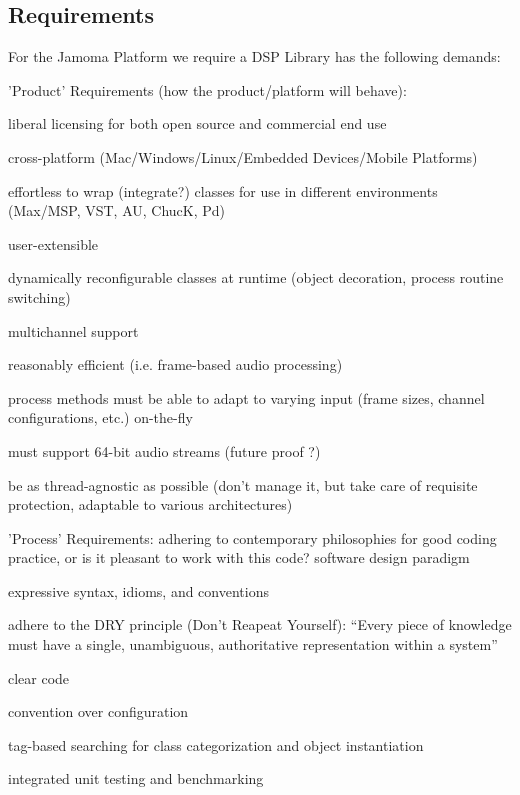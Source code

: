 \documentclass[twoside,10pt]{article}
\newenvironment{packed_item}{
\begin{itemize}
  \setlength{\itemsep}{1pt}
  \setlength{\parskip}{0pt}
  \setlength{\parsep}{0pt}
}{\end{itemize}}
\begin{document}
\subsection{Requirements}

For the Jamoma Platform we require a DSP Library has the following demands:

'Product' Requirements (how the product/platform will behave):
\begin{packed_item}%
	\item liberal licensing for both open source and commercial end use
	\item cross-platform (Mac/Windows/Linux/Embedded Devices/Mobile Platforms)
	
	\item effortless to wrap (integrate?) classes for use in different environments (Max/MSP, VST, AU, ChucK, Pd)
	\item user-extensible
	\item dynamically reconfigurable classes at runtime (object decoration, process routine switching)
	\item multichannel support
	\item reasonably efficient (i.e. frame-based audio processing)
	\item process methods must be able to adapt to varying input (frame sizes, channel configurations, etc.) on-the-fly
	\item must support 64-bit audio streams (future proof ?)
	\item be as thread-agnostic as possible (don't manage it, but take care of requisite protection, adaptable to various architectures)
\end{packed_item}%


'Process' Requirements:  adhering to contemporary philosophies for good coding practice, or is it pleasant to work with this code? software design paradigm
\begin{packed_item}%
	\item expressive syntax, idioms, and conventions
	\item adhere to the DRY principle (Don't Reapeat Yourself): ``Every piece of knowledge must have a single, unambiguous, authoritative representation within a system''\cite{Hunt:1999}
	\item clear code %
	\item convention over configuration
	\item tag-based searching for class categorization and object instantiation
	\item integrated unit testing and benchmarking %

\end{packed_item}%
\end{document}
